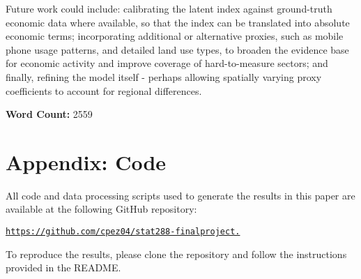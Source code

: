 \documentclass[12pt]{article}
\begin{document}
Future work could include: calibrating the latent index against ground-truth economic data where available, so that the index can be translated into absolute economic terms; incorporating additional or alternative proxies, such as mobile phone usage patterns, and detailed land use types, to broaden the evidence base for economic activity and improve coverage of hard-to-measure sectors; and finally, refining the model itself - perhaps allowing spatially varying proxy coefficients to account for regional differences. 

\noindent \textbf{Word Count:} 2559

\newpage


\printbibliography

\section*{Appendix: Code}
\label{appendix:code}

All code and data processing scripts used to generate the results in this paper are available at the following GitHub repository:

\begin{center}
\href{https://github.com/cpez04/stat288-finalproject}{\texttt{https://github.com/cpez04/stat288-finalproject.}}
\end{center}

To reproduce the results, please clone the repository and follow the instructions provided in the README.
\end{document}
